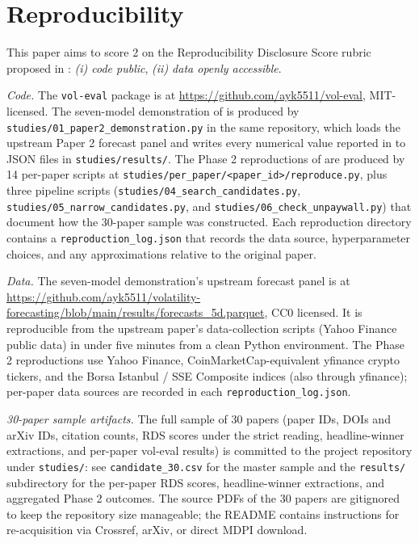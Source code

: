 \section{Reproducibility}\label{sec:reproducibility}

\sloppy

This paper aims to score 2 on the Reproducibility Disclosure Score rubric proposed in \citet{Khan2026Survey}: \emph{(i) code public}, \emph{(ii) data openly accessible}.

\textit{Code.} The \texttt{vol-eval} package is at \url{https://github.com/ayk5511/vol-eval}, MIT-licensed. The seven-model demonstration of  is produced by \texttt{studies/01\_paper2\_demonstration.py} in the same repository, which loads the upstream Paper 2 forecast panel and writes every numerical value reported in  to JSON files in \texttt{studies/results/}. The Phase 2 reproductions of  are produced by 14 per-paper scripts at \texttt{studies/per\_paper/<paper\_id>/reproduce.py}, plus three pipeline scripts (\texttt{studies/04\_search\_candidates.py}, \texttt{studies/05\_narrow\_candidates.py}, and \texttt{studies/06\_check\_unpaywall.py}) that document how the 30-paper sample was constructed. Each reproduction directory contains a \texttt{reproduction\_log.json} that records the data source, hyperparameter choices, and any approximations relative to the original paper.

\textit{Data.} The seven-model demonstration's upstream forecast panel is at \url{https://github.com/ayk5511/volatility-forecasting/blob/main/results/forecasts_5d.parquet}, CC0 licensed. It is reproducible from the upstream paper's data-collection scripts (Yahoo Finance public data) in under five minutes from a clean Python environment. The Phase 2 reproductions use Yahoo Finance, CoinMarketCap-equivalent yfinance crypto tickers, and the Borsa Istanbul / SSE Composite indices (also through yfinance); per-paper data sources are recorded in each \texttt{reproduction\_log.json}.

\textit{30-paper sample artifacts.} The full sample of 30 papers (paper IDs, DOIs and arXiv IDs, citation counts, RDS scores under the strict reading, headline-winner extractions, and per-paper vol-eval results) is committed to the project repository under \texttt{studies/}: see \texttt{candidate\_30.csv} for the master sample and the \texttt{results/} subdirectory for the per-paper RDS scores, headline-winner extractions, and aggregated Phase 2 outcomes. The source PDFs of the 30 papers are gitignored to keep the repository size manageable; the README contains instructions for re-acquisition via Crossref, arXiv, or direct MDPI download.

